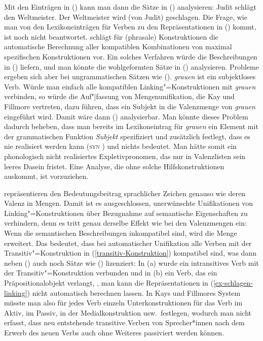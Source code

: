 \zl
Mit den Einträgen in () kann man dann die Sätze in () analysieren:
\eal
\ex Judit schlägt den Weltmeister.
\ex Der Weltmeister wird (von Judit) geschlagen.
\zl
Die Frage, wie man von den Lexikoneinträgen für Verben zu den Repräsentationen in ()
kommt, ist noch nicht beantwortet. \citet{Kay2002a} schlägt für (phrasale) Konstruktionen
die automatische Berechnung aller kompatiblen Kombinationen von maximal spezifischen
Konstruktionen vor. Ein solches Verfahren würde die Beschreibungen in () liefern,
und man könnte die wohlgeformten Sätze in () analysieren.
Probleme ergeben sich aber bei ungrammatischen Sätzen wie (). \emph{grauen} ist ein
subjektloses Verb. Würde man einfach alle kompatiblen Linking"=Konstruktionen mit \emph{grauen}
verbinden, so würde die Auf"|fassung von Mengenunifikation, die Kay und Fillmore vertreten, dazu führen,
dass ein Subjekt in die Valenzmenge von \emph{grauen} eingeführt wird. Damit wäre dann ()
analysierbar.
\z
Man könnte dieses Problem dadurch beheben, dass man bereits im Lexikoneintrag für \emph{grauen}
ein Element mit der grammatischen Funktion \emph{Subjekt} spezifiziert und zusätzlich festlegt,
dass es nie realisiert werden kann (\textsc{syn} ) und nichts bedeutet. Man hätte somit
ein phonologisch nicht realisiertes Expletivpronomen, das nur in Valenzlisten sein leeres Dasein
fristet. Eine Analyse, die ohne solche Hilfskonstruktionen auskommt, ist vorzuziehen.

\citet{KF99a} repräsentieren den Bedeutungsbeitrag sprachlicher Zeichen genauso wie deren Valenz in Mengen.
Damit ist es ausgeschlossen, unerwünschte Unifikationen von Linking"=Konstruktionen über Bezugnahme
auf semantische Eigenschaften zu verhindern, denn es tritt genau derselbe Effekt wie bei den
Valenzmengen ein: Wenn die semantischen Beschreibungen inkompatibel sind, wird die Menge erweitert. Das bedeutet, dass bei
automatischer Unifikation alle Verben mit der Transitiv"=Konstruktion in (\ref{transitiv-Konstruktion}) kompatibel sind,
was dann neben () auch noch Sätze wie () lizenziert:
\eal
{}
\zl
\largerpage[2]
In (a) wurde ein intransitives Verb mit der Transitiv"=Konstruktion verbunden und in
(b) ein Verb, das ein Präpositionalobjekt verlangt, \dash, man kann die Repräsentationen in
(\ref{ex-schlagen-linking}) nicht automatisch berechnen lassen. In Kays und Fillmores System müsste
man also für jedes Verb einzeln Unterkonstruktionen für das Verb im Aktiv, im Passiv, in der
Medialkonstruktion usw.\ festlegen, wodurch man nicht erfasst, dass neu entstehende transitive Verben
von Sprecher*innen nach dem Erwerb des neuen Verbs auch ohne Weiteres passiviert werden können.%
%

